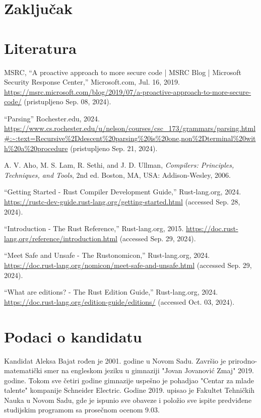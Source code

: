 \documentclass[11pt]{article}
\begin{document}
\newpage
\section{Zaključak}

\newpage
\section{Literatura}

\begin{thebibliography}
    \raggedright
{} 
    MSRC, “A proactive approach to more secure code | MSRC Blog | 
    Microsoft Security Response Center,” Microsoft.com, Jul. 16, 2019. 
    \url{https://msrc.microsoft.com/blog/2019/07/a-proactive-approach-to-more-secure-code/} 
    (pristupljeno Sep. 08, 2024).

    “Parsing” Rochester.edu, 2024.
    \url{https://www.cs.rochester.edu/u/nelson/courses/csc_173/grammars/parsing.html#:~:text=Recursive%2Ddescent%20parsing%20is%20one,non%2Dterminal%20with%20a%20procedure} 
    (pristupljeno Sep. 21, 2024).

    A. V. Aho, M. S. Lam, R. Sethi, and J. D. Ullman, \emph{Compilers: Principles, Techniques, and Tools}, 2nd ed. Boston, MA, USA: Addison-Wesley, 2006.

    “Getting Started - Rust Compiler Development Guide,” Rust-lang.org, 2024. 
    \url{https://rustc-dev-guide.rust-lang.org/getting-started.html} (accessed Sep. 28, 2024).

    “Introduction - The Rust Reference,” Rust-lang.org, 2015. 
    \url{https://doc.rust-lang.org/reference/introduction.html} (accessed Sep. 29, 2024).
    
    “Meet Safe and Unsafe - The Rustonomicon,” Rust-lang.org, 2024. 
    \url{https://doc.rust-lang.org/nomicon/meet-safe-and-unsafe.html} (accessed Sep. 29, 2024).

    “What are editions? - The Rust Edition Guide,” Rust-lang.org, 2024.
    \url{https://doc.rust-lang.org/edition-guide/editions/} (accessed Oct. 03, 2024).
\end{thebibliography}

\newpage
\section{Podaci o kandidatu}


Kandidat Aleksa Bajat rođen je 2001. godine u Novom Sadu. Završio je prirodno-matematički smer na engleskom jeziku 
u gimnaziji "Jovan Jovanović Zmaj" 2019. godine. Tokom sve četiri godine gimnazije uspešno je pohadjao 
"Centar za mlade talente" kompanije Schneider Electric.  Godine 2019. upisao je Fakultet 
Tehničkih Nauka u Novom Sadu, gde je ispunio sve obaveze i položio sve ispite predviđene 
studijskim programom sa prosečnom ocenom 9.03.
\end{document}
